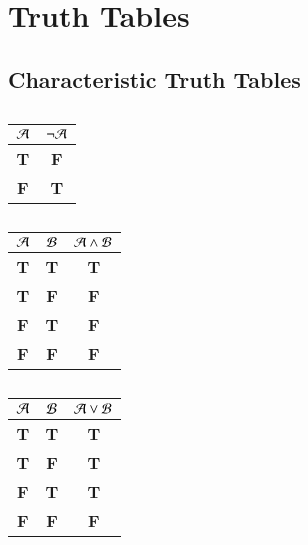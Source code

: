 %
%
%
\chapter{Truth Tables}
\label{TruthTab} %

\section{ Characteristic Truth Tables}


\begin{table}[H]
    \centering
    \caption{}
    \begin{tabular}{c|c}
        $\mathcal{A}$ & $\lnot \mathcal{A}$ \\ \hline
        \textbf{T} & \textbf{F} \\
        \textbf{F} & \textbf{T}
    \end{tabular}
\end{table}


\begin{table}[H]
    \centering
    \caption{}
    \begin{tabular}{cc|c}
        $\mathcal{A}$ & $\mathcal{B}$ & $\mathcal{A} \wedge \mathcal{B}$\\ \hline
        \textbf{T} & \textbf{T} & \textbf{T} \\
        \textbf{T} & \textbf{F} & \textbf{F} \\
        \textbf{F} & \textbf{T} & \textbf{F} \\
        \textbf{F} & \textbf{F} & \textbf{F}
    \end{tabular}
\end{table}


\begin{table}[H]
    \centering
    \caption{}
    \begin{tabular}{cc|c}
        $\mathcal{A}$ & $\mathcal{B}$ & $\mathcal{A}\lor \mathcal{B}$ \\ \hline
        \textbf{T} & \textbf{T} & \textbf{T} \\
        \textbf{T} & \textbf{F} & \textbf{T} \\
        \textbf{F} & \textbf{T} & \textbf{T} \\
        \textbf{F} & \textbf{F} & \textbf{F}
    \end{tabular}
\end{table}


